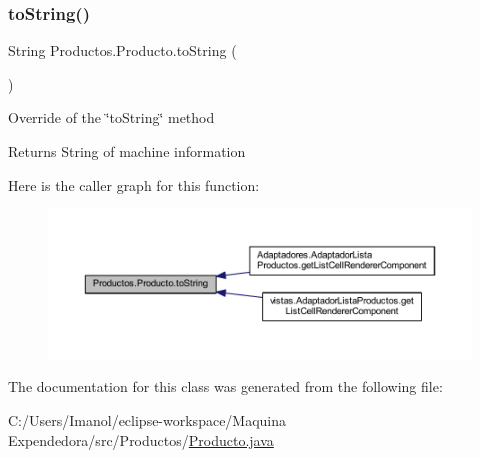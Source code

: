 \subsubsection{\texorpdfstring{to\+String()}{toString()}}
{\footnotesize\ttfamily String Productos.\+Producto.\+to\+String (\begin{DoxyParamCaption}{ }\end{DoxyParamCaption})}

Override of the \char`\"{}to\+String\char`\"{} method \begin{DoxyReturn}{Returns}
String of machine information 
\end{DoxyReturn}
Here is the caller graph for this function\+:
\nopagebreak
\begin{figure}[H]
\begin{center}
\leavevmode
\includegraphics[width=350pt]{class_productos_1_1_producto_a0516e55bd0c688748075bb13fd949595_icgraph}
\end{center}
\end{figure}


The documentation for this class was generated from the following file\+:\begin{DoxyCompactItemize}
\item 
C\+:/\+Users/\+Imanol/eclipse-\/workspace/\+Maquina Expendedora/src/\+Productos/\mbox{\hyperlink{_producto_8java}{Producto.\+java}}\end{DoxyCompactItemize}
